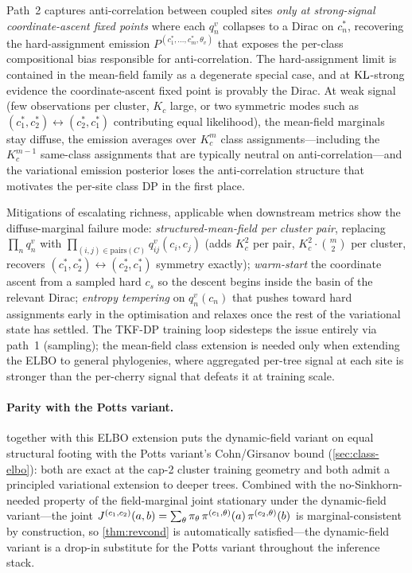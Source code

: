 Path~2 captures anti-correlation between coupled sites \emph{only
at strong-signal coordinate-ascent fixed points} where each
$q_n^v$ collapses to a Dirac on $c_n^*$, recovering the
hard-assignment emission $P^{(c_1^*, \dots, c_m^*, \theta_v)}$ that
exposes the per-class compositional bias responsible for
anti-correlation. The hard-assignment limit is contained in the
mean-field family as a degenerate special case, and at
$\mathrm{KL}$-strong evidence the coordinate-ascent fixed point is
provably the Dirac. At weak signal (few observations per cluster,
$K_c$ large, or two symmetric modes such as $(c_1^*, c_2^*)
\leftrightarrow (c_2^*, c_1^*)$ contributing equal likelihood),
the mean-field marginals stay diffuse, the emission averages over
$K_c^m$ class assignments---including the $K_c^{m-1}$ same-class
assignments that are typically neutral on anti-correlation---and
the variational emission posterior loses the anti-correlation
structure that motivates the per-site class DP in the first place.

Mitigations of escalating richness, applicable when downstream
metrics show the diffuse-marginal failure mode:
\emph{structured-mean-field per cluster pair}, replacing
$\prod_n q_n^v$ with
$\prod_{(i, j) \in \text{pairs}(C)} q_{ij}^v(c_i, c_j)$ (adds
$K_c^2$ per pair, $K_c^2 \cdot \binom{m}{2}$ per cluster, recovers
$(c_1^*, c_2^*) \leftrightarrow (c_2^*, c_1^*)$ symmetry exactly);
\emph{warm-start} the coordinate ascent from a sampled hard
$c_s$ so the descent begins inside the basin of the relevant
Dirac; \emph{entropy tempering} on $q_n^v(c_n)$ that pushes
toward hard assignments early in the optimisation and relaxes
once the rest of the variational state has settled. The TKF-DP
training loop sidesteps the issue entirely via path~1 (sampling);
the mean-field class extension is needed only when extending the
ELBO to general phylogenies, where aggregated per-tree signal at
each site is stronger than the per-cherry signal that defeats it
at training scale.

\paragraph{Parity with the Potts variant.}
 together with this ELBO extension puts the
dynamic-field variant on equal structural footing with the Potts
variant's Cohn/Girsanov bound (\autoref{sec:class-elbo}): both are
exact at the cap-2 cluster training geometry and both admit a
principled variational extension to deeper trees. Combined with the
no-Sinkhorn-needed property of the field-marginal joint stationary
under the dynamic-field variant---the joint
$J^{(c_1,c_2)}(a,b)=\sum_\theta \pi_\theta\,\pi^{(c_1,\theta)}(a)\,\pi^{(c_2,\theta)}(b)$
is marginal-consistent by construction, so \autoref{thm:revcond} is
automatically satisfied---the dynamic-field variant is a drop-in
substitute for the Potts variant throughout the inference stack.

